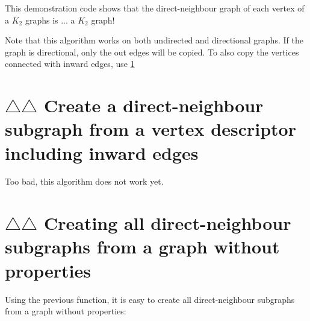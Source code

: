 This demonstration code shows that the direct-neighbour graph of each vertex
 of a $K_{2}$ graphs is ... a $K_{2}$ graph!



Note that this algorithm works on both undirected and directional graphs.
If the graph is directional, only the out edges will be copied.
To also copy the vertices connected with inward edges, use 
\ref{subsec:create_direct_neighbour_subgraph_including_in_edges}

\section{$\triangle$$\triangle$ Create a direct-neighbour subgraph from a vertex descriptor including inward edges}
\label{subsec:create_direct_neighbour_subgraph_including_in_edges}

Too bad, this algorithm does not work yet.



\section{$\triangle$$\triangle$ Creating all direct-neighbour subgraphs from a graph without properties}
\label{subsec:create_all_direct_neighbour_subgraphs}

Using the previous function, it is easy to create all direct-neighbour subgraphs
 from a graph without properties:



